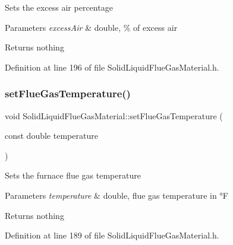Sets the excess air percentage 
\begin{DoxyParams}{Parameters}
{\em excess\+Air} & double, \% of excess air \\
\hline
\end{DoxyParams}
\begin{DoxyReturn}{Returns}
nothing 
\end{DoxyReturn}


Definition at line 196 of file Solid\+Liquid\+Flue\+Gas\+Material.\+h.

\mbox{\label{class_solid_liquid_flue_gas_material_ae647700dbff5ccea7938b2117f2c3156}} 
\subsubsection{\texorpdfstring{set\+Flue\+Gas\+Temperature()}{setFlueGasTemperature()}\hspace{0.1cm}{\footnotesize\ttfamily [1/3]}}
{\footnotesize\ttfamily void Solid\+Liquid\+Flue\+Gas\+Material\+::set\+Flue\+Gas\+Temperature (\begin{DoxyParamCaption}\item[{const double}]{temperature }\end{DoxyParamCaption})\hspace{0.3cm}{\ttfamily [inline]}}

Sets the furnace flue gas temperature 
\begin{DoxyParams}{Parameters}
{\em temperature} & double, flue gas temperature in °F \\
\hline
\end{DoxyParams}
\begin{DoxyReturn}{Returns}
nothing 
\end{DoxyReturn}


Definition at line 189 of file Solid\+Liquid\+Flue\+Gas\+Material.\+h.

\mbox{\label{class_solid_liquid_flue_gas_material_ae647700dbff5ccea7938b2117f2c3156}} 
